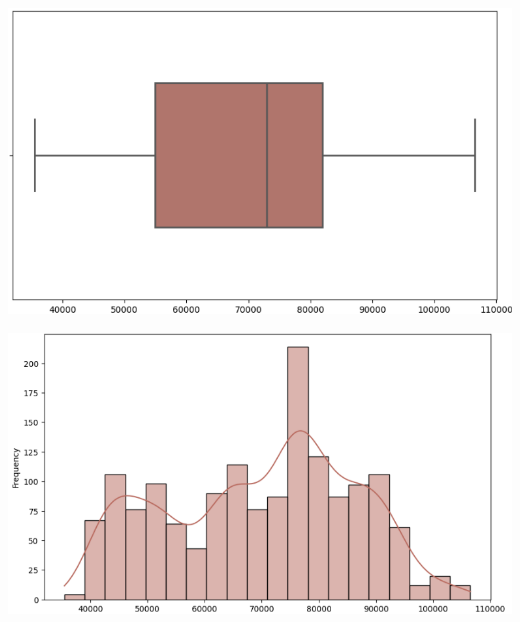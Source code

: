 \documentclass[conference]{IEEEtran}
\begin{document}
\begin{minipage}{0.23\textwidth}
    \centering
    \includegraphics[width=\linewidth]{images/vcb_boxplot.png}
    \label{fig:image1}
\end{minipage}
\hfill
\begin{minipage}{0.23\textwidth}
    \centering
    \includegraphics[width=\linewidth]{images/vcb_histogram.png}
    \label{fig:image2}
\end{minipage}
\end{document}
